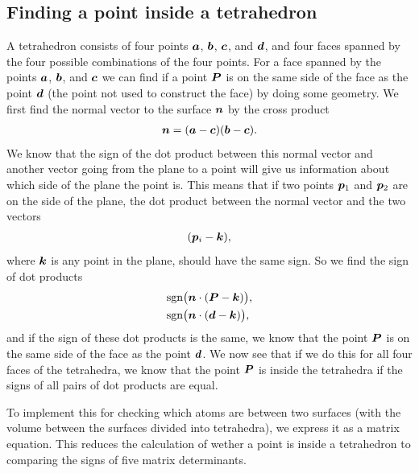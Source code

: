 \subsection{Finding a point inside a tetrahedron}
A tetrahedron consists of four points $\boldsymbol{a}$, $\boldsymbol{b}$, $\boldsymbol{c}$, and $\boldsymbol{d}$, and four faces spanned by the four possible combinations of the four points. For a face spanned by the points $\boldsymbol{a}$, $\boldsymbol{b}$, and $\boldsymbol{c}$ we can find if a point $\boldsymbol{P}$ is on the same side of the face as the point $\boldsymbol{d}$ (the point not used to construct the face) by doing some geometry. We first find the normal vector to the surface $\boldsymbol{n}$ by the cross product 
\begin{align*}
    \boldsymbol{n} = (\boldsymbol{a}-\boldsymbol{c})(\boldsymbol{b}-\boldsymbol{c}).
\end{align*}
We know that the sign of the dot product between this normal vector and another vector going from the plane to a point will give us information about which side of the plane the point is. This means that if two points $\boldsymbol{p}_1$ and $\boldsymbol{p}_2$ are on the side of the plane, the dot product between the normal vector and the two vectors
\begin{align*}
    (\boldsymbol{p}_i - \boldsymbol{k}),
\end{align*}
where $\boldsymbol{k}$ is any point in the plane, should have the same sign. So we find the sign of dot products
\begin{align*}
    &\text{sgn}\big(\boldsymbol{n}\cdot(\boldsymbol{P} - \boldsymbol{k})\big), \\
    &\text{sgn}\big(\boldsymbol{n}\cdot(\boldsymbol{d} - \boldsymbol{k})\big),
\end{align*}
and if the sign of these dot products is the same, we know that the point $\boldsymbol{P}$ is on the same side of the face as the point $\boldsymbol{d}$. We now see that if we do this for all four faces of the tetrahedra, we know that the point $\boldsymbol{P}$ is inside the tetrahedra if the signs of all pairs of dot products are equal.

To implement this for checking which atoms are between two surfaces (with the volume between the surfaces divided into tetrahedra), we express it as a matrix equation. This reduces the calculation of wether a point is inside a tetrahedron to comparing the signs of five matrix determinants.

